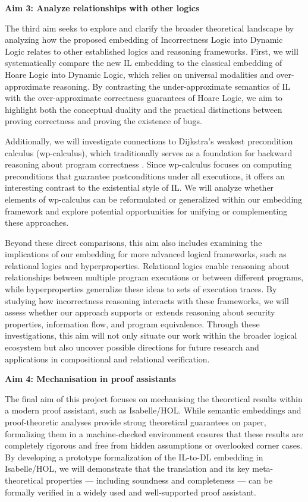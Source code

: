 \textbf{Aim 3: Analyze relationships with other logics}

The third aim seeks to explore and clarify the broader theoretical landscape by analyzing how the proposed embedding of Incorrectness Logic into Dynamic Logic relates to other established logics and reasoning frameworks. First, we will systematically compare the new IL embedding to the classical embedding of Hoare Logic into Dynamic Logic, which relies on universal modalities and over-approximate reasoning. By contrasting the under-approximate semantics of IL with the over-approximate correctness guarantees of Hoare Logic, we aim to highlight both the conceptual duality and the practical distinctions between proving correctness and proving the existence of bugs.

Additionally, we will investigate connections to Dijkstra’s weakest precondition calculus (wp-calculus), which traditionally serves as a foundation for backward reasoning about program correctness \cite{dijkstra1976discipline}. Since wp-calculus focuses on computing preconditions that guarantee postconditions under all executions, it offers an interesting contrast to the existential style of IL. We will analyze whether elements of wp-calculus can be reformulated or generalized within our embedding framework and explore potential opportunities for unifying or complementing these approaches.

Beyond these direct comparisons, this aim also includes examining the implications of our embedding for more advanced logical frameworks, such as relational logics and hyperproperties. Relational logics enable reasoning about relationships between multiple program executions or between different programs, while hyperproperties generalize these ideas to sets of execution traces. By studying how incorrectness reasoning interacts with these frameworks, we will assess whether our approach supports or extends reasoning about security properties, information flow, and program equivalence. Through these investigations, this aim will not only situate our work within the broader logical ecosystem but also uncover possible directions for future research and applications in compositional and relational verification.

\textbf{Aim 4: Mechanisation in proof assistants}

The final aim of this project focuses on mechanising the theoretical results within a modern proof assistant, such as Isabelle/HOL. While semantic embeddings and proof-theoretic analyses provide strong theoretical guarantees on paper, formalizing them in a machine-checked environment ensures that these results are completely rigorous and free from hidden assumptions or overlooked corner cases. By developing a prototype formalization of the IL-to-DL embedding in Isabelle/HOL, we will demonstrate that the translation and its key meta-theoretical properties — including soundness and completeness — can be formally verified in a widely used and well-supported proof assistant.

